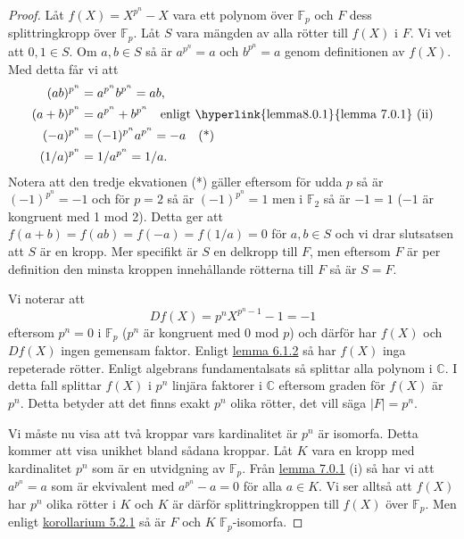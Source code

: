 \documentclass{article}
\theoremstyle{definition}
\begin{document}
\begin{proof}
  Låt $f(X) = X^{p^n} -X$ vara ett polynom över $\mathbb{F}_p$ och $F$ dess splittringkropp över $\mathbb{F}_p.$ Låt $S$ vara mängden 
  av alla rötter till $f(X)$ i $F$. Vi vet att $0, 1 \in S$. Om $a, b \in S$ så är $a^{p^n} = a$ och $b^{p^n} = a$ genom definitionen av $f(X).$ 
  Med detta får vi att 
  \begin{align*}
    (ab)^{p^n} &= a^{p^n}b^{p^n} = ab, \\
    (a + b)^{p^n} &= a^{p^n} + b^{p^n} \quad \textnormal{enligt \hyperlink{lemma8.0.1}{lemma 7.0.1} (ii)} \\
    (-a)^{p^n} &= (-1)^{p^n}a^{p^n} = -a \quad \textnormal{(*)} \\
    (1/a)^{p^n} &= 1/a^{p^n} = 1/a.
  \end{align*}
  Notera att den tredje ekvationen (*) gäller eftersom för udda $p$ så är $(-1)^{p^n} = -1$ och för $p = 2$ så är $(-1)^{p^n} = 1$
  men i $\mathbb{F}_2$ så är $-1 = 1$ ($-1$ är kongruent med 1 mod 2). Detta ger att 
  $f(a + b) = f(ab) = f(-a) = f(1/a) = 0$ för $a, b \in S$ och vi drar slutsatsen att $S$ är en kropp. Mer specifikt är $S$ en delkropp till $F$, 
  men eftersom $F$ är per definition den minsta kroppen innehållande rötterna till $F$ så är $S = F.$

  Vi noterar att 
  \[Df(X) = p^nX^{p^n-1} - 1 = -1\]
  eftersom $p^n = 0$ i $\mathbb{F}_p$ ($p^n$ är kongruent med 0 mod $p$) och därför har $f(X)$ och $Df(X)$ ingen gemensam faktor. Enligt 
  \hyperlink{lemma7.1.2}{lemma 6.1.2} så har $f(X)$ inga repeterade rötter. Enligt algebrans fundamentalsats så splittar 
  alla polynom i $\mathbb{C}$. I detta fall splittar $f(X)$ i $p^n$ linjära faktorer i $\mathbb{C}$ eftersom graden för $f(X)$ är $p^n$. 
  Detta betyder att det finns exakt $p^n$ olika rötter, det vill säga $|F| = p^n$. 

  Vi måste nu visa att två kroppar vars kardinalitet är $p^n$ är isomorfa. Detta kommer att visa unikhet bland sådana kroppar. Låt $K$ vara
  en kropp med kardinalitet $p^n$ som är en utvidgning av $\mathbb{F}_p$. Från \hyperlink{lemma8.0.1}{lemma 7.0.1} (i) så har vi att
  $a^{p^n} = a$ som är ekvivalent med $a^{p^n} - a = 0$ för alla $a \in K$. Vi ser alltså att $f(X)$ har $p^n$ olika rötter i $K$ och 
  $K$ är därför splittringkroppen till $f(X)$ över $\mathbb{F}_p$. Men enligt \hyperlink{kol6.2.1}{korollarium 5.2.1} så är $F$ och $K$ $\mathbb{F}_p$-isomorfa.
\end{proof}
\end{document}

